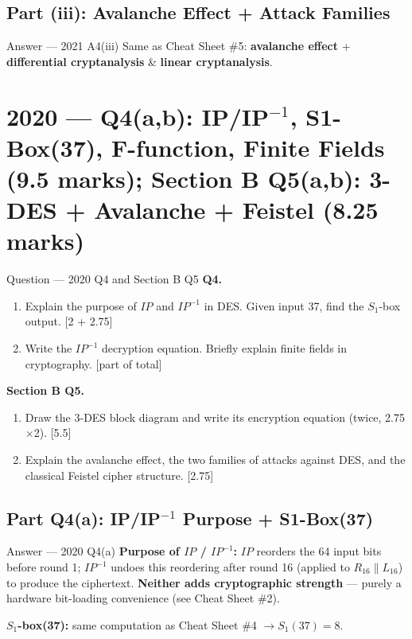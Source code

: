 \documentclass[12pt,a4paper]{article}
\begin{document}
\subsection{Part (iii): Avalanche Effect + Attack Families}
\begin{solbox}{Answer --- 2021 A4(iii)}
Same as Cheat Sheet \#5: \textbf{avalanche effect} + \textbf{differential cryptanalysis} \& \textbf{linear cryptanalysis}.
\end{solbox}

\newpage
\section{2020 --- Q4(a,b): IP/IP$^{-1}$, S1-Box(37), F-function, Finite Fields (9.5 marks); Section B Q5(a,b): 3-DES + Avalanche + Feistel (8.25 marks)}

\begin{qbox}{Question --- 2020 Q4 and Section B Q5}
\textbf{Q4.}
\begin{enumerate}[label=(\alph*)]
  \item Explain the purpose of $IP$ and $IP^{-1}$ in DES. Given input 37, find the $S_1$-box output. \hfill [2 + 2.75]
  \item Write the $IP^{-1}$ decryption equation. Briefly explain finite fields in cryptography. \hfill [part of total]
\end{enumerate}
\textbf{Section B Q5.}
\begin{enumerate}[label=(\alph*)]
  \item Draw the 3-DES block diagram and write its encryption equation (twice, 2.75$\times$2). \hfill [5.5]
  \item Explain the avalanche effect, the two families of attacks against DES, and the classical Feistel cipher structure. \hfill [2.75]
\end{enumerate}
\end{qbox}

\subsection{Part Q4(a): IP/IP$^{-1}$ Purpose + S1-Box(37)}
\begin{solbox}{Answer --- 2020 Q4(a)}
\textbf{Purpose of $IP$ / $IP^{-1}$:} $IP$ reorders the 64 input bits before round 1; $IP^{-1}$ undoes this reordering after round 16 (applied to $R_{16}\|L_{16}$) to produce the ciphertext. \textbf{Neither adds cryptographic strength} --- purely a hardware bit-loading convenience (see Cheat Sheet \#2).

\textbf{$S_1$-box(37):} same computation as Cheat Sheet \#4 $\to \boxed{S_1(37)=8}$.
\end{solbox}
\end{document}
